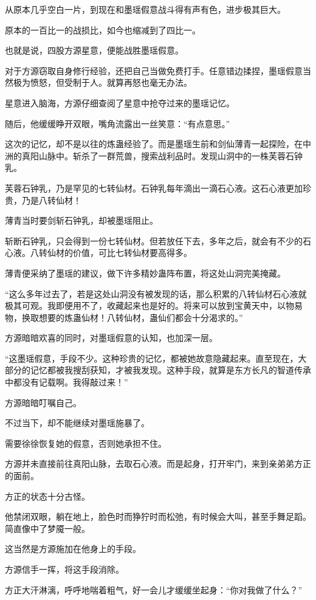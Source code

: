 \begin{this_body}
从原本几乎空白一片，到现在和墨瑶假意战斗得有声有色，进步极其巨大。

原本的一百比一的战损比，如今也缩减到了四比一。

也就是说，四股方源星意，便能战胜墨瑶假意。

对于方源窃取自身修行经验，还把自己当做免费打手。任意错边揉捏，墨瑶假意当然极为愤怒，但受制于人。就算再怒也毫无办法。

星意进入脑海，方源仔细查阅了星意中抢夺过来的墨瑶记忆。

随后，他缓缓睁开双眼，嘴角流露出一丝笑意：“有点意思。”

这次的记忆，却不是以往的炼蛊经验了。而是墨瑶生前和剑仙薄青一起探险，在中洲的真阳山脉中。斩杀了一群荒兽，搜索战利品时。发现山洞中的一株芙蓉石钟乳。

芙蓉石钟乳，乃是罕见的七转仙材。石钟乳每年滴出一滴石心液。这石心液更加珍贵，乃是八转仙材！

薄青当时要剑斩石钟乳，却被墨瑶阻止。

斩断石钟乳，只会得到一份七转仙材。但若放任下去，多年之后，就会有不少的石心液。八转仙材的价值，可比七转仙材要高得多。

薄青便采纳了墨瑶的建议，做下许多精妙蛊阵布置，将这处山洞完美掩藏。

“这么多年过去了，若是这处山洞没有被发现的话，那么积累的八转仙材石心液就极其可观。我即便用不了，收藏起来也是好的。将来可以放到宝黄天中，以物易物，换取想要的炼蛊仙材！八转仙材，蛊仙们都会十分渴求的。”

方源暗暗欢喜的同时，对墨瑶假意的认知，也加深一层。

“这墨瑶假意，手段不少。这种珍贵的记忆，都被她故意隐藏起来。直至现在，大部分的记忆都被我搜刮获知，才被我发现。这种手段，就算是东方长凡的智道传承中都没有记载啊。我得敲过来！”

方源暗暗叮嘱自己。

不过当下，却不能继续对墨瑶施暴了。

需要徐徐恢复她的假意，否则她承担不住。

方源并未直接前往真阳山脉，去取石心液。而是起身，打开牢门，来到亲弟弟方正的面前。

方正的状态十分古怪。

他禁闭双眼，躺在地上，脸色时而狰狞时而松弛，有时候会大叫，甚至手舞足蹈。简直像中了梦魇一般。

这当然是方源施加在他身上的手段。

方源信手一挥，将这手段消除。

方正大汗淋漓，呼呼地喘着粗气，好一会儿才缓缓坐起身：“你对我做了什么？”


\end{this_body}
